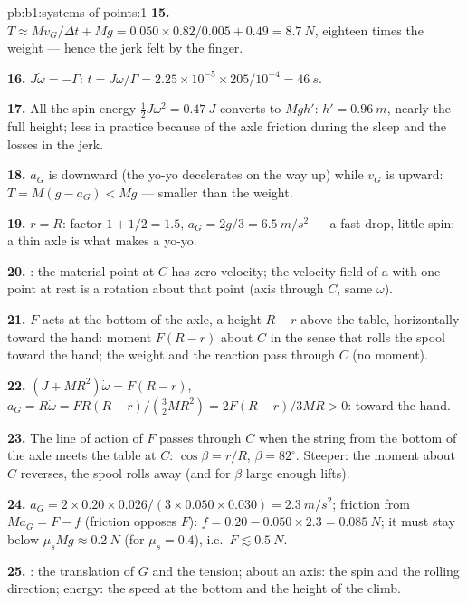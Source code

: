 \begin{solution}{pb:b1:systems-of-points:1}
\textbf{15.} $T \approx Mv_G/\Delta t + Mg = 0.050 \times 0.82/0.005 + 0.49 =
\qty{8.7}{N}$, eighteen times the weight --- hence the jerk felt by the
finger.

\textbf{16.} $J\dot\omega = -\Gamma$: $t = J\omega/\Gamma = 2.25\times10^{-5} \times
205/10^{-4} = \qty{46}{s}$.

\textbf{17.} All the spin energy $\tfrac12 J\omega^2 = \qty{0.47}{J}$ converts
to $Mgh'$: $h' = \qty{0.96}{m}$, nearly the full height; less in practice
because of the axle friction during the sleep and the losses in the
jerk.

\textbf{18.} $a_G$ is downward (the yo-yo decelerates on the way up) while
$v_G$ is upward: $T = M(g - a_G) < Mg$ --- smaller than the weight.

\textbf{19.} $r = R$: factor $1 + 1/2 = 1.5$, $a_G = 2g/3 = \qty{6.5}{m/s^2}$
--- a fast drop, little spin: a thin axle is what makes a yo-yo.

\textbf{20.} : the material point at $C$ has zero
velocity; the velocity field of a  with one point at rest is
a rotation about that point (axis through $C$, same $\omega$).

\textbf{21.} $F$ acts at the bottom of the axle, a height $R - r$ above
the table, horizontally toward the hand: moment $F(R - r)$ about $C$ in
the sense that rolls the spool toward the hand; the weight and the
reaction pass through $C$ (no moment).

\textbf{22.} $(J + MR^2)\dot\omega = F(R - r)$, $a_G = R\dot\omega = FR(R - r)/
(\tfrac32 MR^2) = 2F(R - r)/3MR > 0$: toward the hand.

\textbf{23.} The line of action of $F$ passes through $C$ when the string
from the bottom of the axle meets the table at $C$: $\cos\beta = r/R$,
$\beta = 82^\circ$. Steeper: the moment about $C$ reverses, the spool rolls
away (and for $\beta$ large enough lifts).

\textbf{24.} $a_G = 2 \times 0.20 \times 0.026/(3 \times 0.050 \times 0.030) =
\qty{2.3}{m/s^2}$; friction from $Ma_G = F - f$ (friction opposes $F$):
$f = 0.20 - 0.050 \times 2.3 = \qty{0.085}{N}$; it must stay below $\mu_sMg
\approx \qty{0.2}{N}$ (for $\mu_s = 0.4$), i.e.\ $F \lesssim \qty{0.5}{N}$.

\textbf{25.} : the translation of $G$ and the tension;
 about an axis: the spin and the rolling direction;
energy: the speed at the bottom and the height of the climb.
\end{solution}
